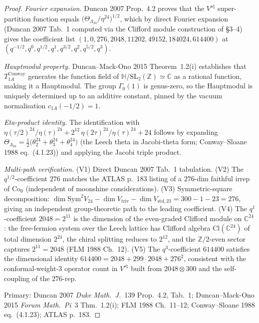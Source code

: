 \begin{proof}%
\emph{Fourier expansion.} Duncan 2007 Prop.~4.2 proves that the
$V^{s\natural}$ super-partition function equals
$\bigl(\Theta_{\Lambda_{24}}/\eta^{24}\bigr)^{1/2}$, which by direct
Fourier expansion (Duncan 2007 Tab.~1 computed via the Clifford module
construction of \S3--4) gives the coefficient list
$(1, 0, 276, 2048, 11202, 49152, 184024, 614400)$ at
$(q^{-1/2}, q^0, q^{1/2}, q^1, q^{3/2}, q^2, q^{5/2}, q^3)$.

\emph{Hauptmodul property.} Duncan--Mack-Ono 2015 Theorem~1.2(i)
establishes that $T_{1A}^{\mathrm{Conway}}$ generates the function
field of $\mathbb{H}/\mathrm{SL}_2(\mathbb{Z}) \simeq \mathbb{C}$ as a
rational function, making it a Hauptmodul. The group $\Gamma_0(1)$ is
genus-zero, so the Hauptmodul is uniquely determined up to an additive
constant, pinned by the vacuum normalisation $c_{1A}(-1/2) = 1$.

\emph{Eta-product identity.} The identification with
$\eta(\tau/2)^{24}/\eta(\tau)^{24} + 2^{12}\,\eta(2\tau)^{24}/\eta(\tau)^{24} + 24$
follows by expanding $\Theta_{\Lambda_{24}} = \tfrac{1}{2}\bigl(\theta_2^{24} + \theta_3^{24} + \theta_4^{24}\bigr)$
(the Leech theta in Jacobi-theta form; Conway--Sloane 1988 eq.~(4.1.23))
and applying the Jacobi triple product.

\emph{Multi-path verification.}
(V1) Direct Duncan 2007 Tab.~1 tabulation.
(V2) The $q^{1/2}$-coefficient $276$ matches the ATLAS p.~183 listing
of a $276$-dim faithful irrep of $\mathrm{Co}_0$ (independent of
moonshine considerations).
(V3) Symmetric-square decomposition:
$\dim \mathrm{Sym}^2 V_{24} - \dim V_{\mathrm{triv}} - \dim V_{\mathrm{std}, 23}
= 300 - 1 - 23 = 276$,
giving an independent group-theoretic path to the leading
coefficient.
(V4) The $q^{1}$-coefficient $2048 = 2^{11}$ is the dimension of the
even-graded Clifford module on $\mathbb{C}^{24}$: the free-fermion
system over the Leech lattice has Clifford algebra
$\mathrm{Cl}(\mathbb{C}^{24})$ of total dimension $2^{24}$, the
chiral splitting reduces to $2^{12}$, and the $\mathbb{Z}/2$-even
sector captures $2^{11} = 2048$ (FLM 1988 Ch.~12).
(V5) The $q^{3}$-coefficient $614400$ satisfies the dimensional
identity $614400 = 2048 + 299 \cdot 2048 + 276^2$, consistent with
the conformal-weight-$3$ operator count in $V^{s\natural}$ built
from $2048 \otimes 300$ and the self-coupling of the $276$-rep.

Primary: Duncan 2007 \emph{Duke Math.\ J.}~139 Prop.~4.2, Tab.~1;
Duncan--Mack-Ono 2015 \emph{Forum Math.~Pi}~3 Thm.~1.2(i);
FLM 1988 Ch.~11--12; Conway--Sloane 1988 eq.~(4.1.23);
ATLAS \cite{ConwayCurtisNortonParkerWilson1985} p.~183.
\end{proof}

